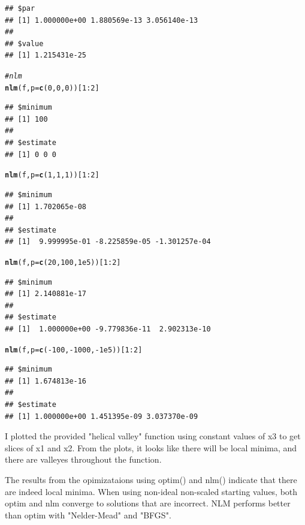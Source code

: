 \documentclass{article}\usepackage[]{graphicx}\usepackage[]{color}
\makeatletter
\newcommand{\hlnum}[1]{\textcolor[rgb]{0.686,0.059,0.569}{#1}}%
\newcommand{\hlcom}[1]{\textcolor[rgb]{0.678,0.584,0.686}{\textit{#1}}}%
\newcommand{\hlopt}[1]{\textcolor[rgb]{0,0,0}{#1}}%
\newcommand{\hlstd}[1]{\textcolor[rgb]{0.345,0.345,0.345}{#1}}%
\newcommand{\hlkwc}[1]{\textcolor[rgb]{0.333,0.667,0.333}{#1}}%
\newcommand{\hlkwd}[1]{\textcolor[rgb]{0.737,0.353,0.396}{\textbf{#1}}}%
\newenvironment{kframe}{%
 \def\at@end@of@kframe{}%
 \ifinner\ifhmode%
  \def\at@end@of@kframe{\end{minipage}}%
  \begin{minipage}{\columnwidth}%
 \fi\fi%
 \def\FrameCommand##1{\hskip\@totalleftmargin \hskip-\fboxsep
 \colorbox{shadecolor}{##1}\hskip-\fboxsep
     \hskip-\linewidth \hskip-\@totalleftmargin \hskip\columnwidth}%
 \MakeFramed {\advance\hsize-\width
   \@totalleftmargin\z@ \linewidth\hsize
   \@setminipage}}%
 {\par\unskip\endMakeFramed%
 \at@end@of@kframe}
\newenvironment{knitrout}{}{} %
\makeatother
\begin{document}
\begin{knitrout}
\begin{kframe}
\begin{alltt}
\end{alltt}
\begin{verbatim}
## $par
## [1] 1.000000e+00 1.880569e-13 3.056140e-13
## 
## $value
## [1] 1.215431e-25
\end{verbatim}
\begin{alltt}
\hlcom{#nlm}
\hlkwd{nlm}\hlstd{(f,} \hlkwc{p} \hlstd{=} \hlkwd{c}\hlstd{(}\hlnum{0}\hlstd{,} \hlnum{0}\hlstd{,} \hlnum{0}\hlstd{))[}\hlnum{1}\hlopt{:}\hlnum{2}\hlstd{]}
\end{alltt}
\begin{verbatim}
## $minimum
## [1] 100
## 
## $estimate
## [1] 0 0 0
\end{verbatim}
\begin{alltt}
\hlkwd{nlm}\hlstd{(f,} \hlkwc{p} \hlstd{=} \hlkwd{c}\hlstd{(}\hlnum{1}\hlstd{,} \hlnum{1}\hlstd{,} \hlnum{1}\hlstd{))[}\hlnum{1}\hlopt{:}\hlnum{2}\hlstd{]}
\end{alltt}
\begin{verbatim}
## $minimum
## [1] 1.702065e-08
## 
## $estimate
## [1]  9.999995e-01 -8.225859e-05 -1.301257e-04
\end{verbatim}
\begin{alltt}
\hlkwd{nlm}\hlstd{(f,} \hlkwc{p} \hlstd{=} \hlkwd{c}\hlstd{(}\hlnum{20}\hlstd{,} \hlnum{100}\hlstd{,} \hlnum{1e5}\hlstd{))[}\hlnum{1}\hlopt{:}\hlnum{2}\hlstd{]}
\end{alltt}
\begin{verbatim}
## $minimum
## [1] 2.140881e-17
## 
## $estimate
## [1]  1.000000e+00 -9.779836e-11  2.902313e-10
\end{verbatim}
\begin{alltt}
\hlkwd{nlm}\hlstd{(f,} \hlkwc{p} \hlstd{=} \hlkwd{c}\hlstd{(}\hlopt{-}\hlnum{100}\hlstd{,} \hlopt{-}\hlnum{1000}\hlstd{,} \hlopt{-}\hlnum{1e5}\hlstd{))[}\hlnum{1}\hlopt{:}\hlnum{2}\hlstd{]}
\end{alltt}
\begin{verbatim}
## $minimum
## [1] 1.674813e-16
## 
## $estimate
## [1] 1.000000e+00 1.451395e-09 3.037370e-09
\end{verbatim}
\end{kframe}
\end{knitrout}

I plotted the provided "helical valley" function using constant values of x3 to get slices of x1 and x2. From the plots, it looks like there will be local minima, and there are valleyes throughout the function. 

The results from the opimizataions using optim() and nlm() indicate that there are indeed local minima. When using non-ideal non-scaled starting values, both optim and nlm converge to solutions that are incorrect. NLM performs better than optim with "Nelder-Mead" and "BFGS". 
\end{document}
